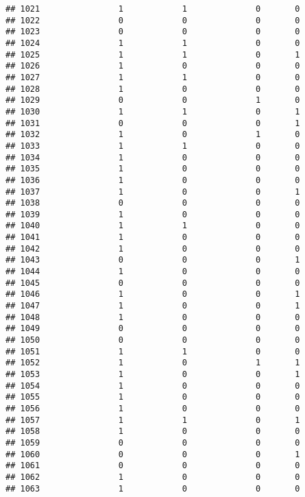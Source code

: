 \documentclass[]{article}
\begin{document}
\begin{verbatim}
## 1021                1            1              0       0
## 1022                0            0              0       0
## 1023                0            0              0       0
## 1024                1            1              0       0
## 1025                1            1              0       1
## 1026                1            0              0       0
## 1027                1            1              0       0
## 1028                1            0              0       0
## 1029                0            0              1       0
## 1030                1            1              0       1
## 1031                0            0              0       1
## 1032                1            0              1       0
## 1033                1            1              0       0
## 1034                1            0              0       0
## 1035                1            0              0       0
## 1036                1            0              0       0
## 1037                1            0              0       1
## 1038                0            0              0       0
## 1039                1            0              0       0
## 1040                1            1              0       0
## 1041                1            0              0       0
## 1042                1            0              0       0
## 1043                0            0              0       1
## 1044                1            0              0       0
## 1045                0            0              0       0
## 1046                1            0              0       1
## 1047                1            0              0       1
## 1048                1            0              0       0
## 1049                0            0              0       0
## 1050                0            0              0       0
## 1051                1            1              0       0
## 1052                1            0              1       1
## 1053                1            0              0       1
## 1054                1            0              0       0
## 1055                1            0              0       0
## 1056                1            0              0       0
## 1057                1            1              0       1
## 1058                1            0              0       0
## 1059                0            0              0       0
## 1060                0            0              0       1
## 1061                0            0              0       0
## 1062                1            0              0       0
## 1063                1            0              0       0

\end{verbatim}
\end{document}
